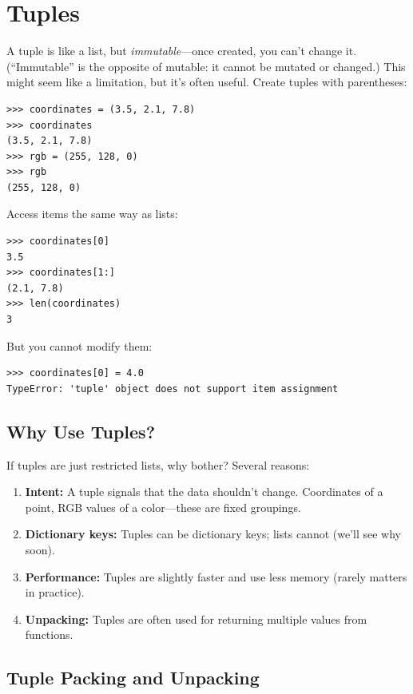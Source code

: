 \section{Tuples}
\label{sec:tuples}

A tuple is like a list, but \emph{immutable}---once created, you can't change it. (``Immutable'' is the opposite of mutable: it cannot be mutated or changed.) This might seem like a limitation, but it's often useful. Create tuples with parentheses:

\begin{lstlisting}
>>> coordinates = (3.5, 2.1, 7.8)
>>> coordinates
(3.5, 2.1, 7.8)
>>> rgb = (255, 128, 0)
>>> rgb
(255, 128, 0)
\end{lstlisting}

Access items the same way as lists:

\begin{lstlisting}
>>> coordinates[0]
3.5
>>> coordinates[1:]
(2.1, 7.8)
>>> len(coordinates)
3
\end{lstlisting}

But you cannot modify them:

\begin{lstlisting}
>>> coordinates[0] = 4.0
TypeError: 'tuple' object does not support item assignment
\end{lstlisting}

\subsection{Why Use Tuples?}

If tuples are just restricted lists, why bother? Several reasons:

\begin{enumerate}
    \item \textbf{Intent:} A tuple signals that the data shouldn't change. Coordinates of a point, RGB values of a color---these are fixed groupings.
    \item \textbf{Dictionary keys:} Tuples can be dictionary keys; lists cannot (we'll see why soon).
    \item \textbf{Performance:} Tuples are slightly faster and use less memory (rarely matters in practice).
    \item \textbf{Unpacking:} Tuples are often used for returning multiple values from functions.
\end{enumerate}

\subsection{Tuple Packing and Unpacking}

